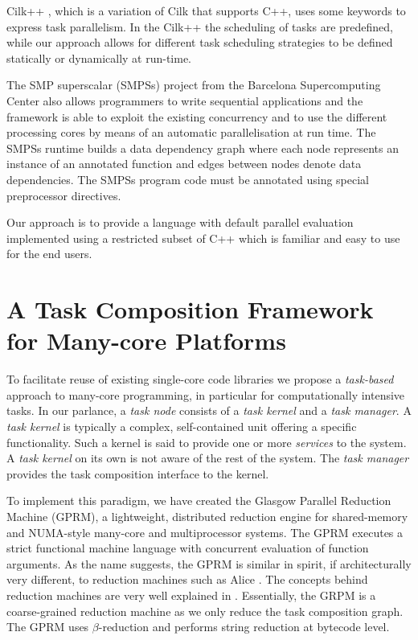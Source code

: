 \documentclass[copyright,creativecommons]{eptcs}
\begin{document}
Cilk++ \cite{leiserson2010cilk++}, which is a variation of Cilk that
supports C++, uses some keywords to express task parallelism. In the
Cilk++ the scheduling of tasks are predefined, while our approach
allows for different task scheduling strategies to be defined statically
or dynamically at run-time.

The SMP superscalar (SMPSs) project from the Barcelona Supercomputing
Center \cite{superscalar2008user,perez2008dependency} also allows
programmers to write sequential applications and the framework is
able to exploit the existing concurrency and to use the different
processing cores by means of an automatic parallelisation at run time.
The SMPSs runtime builds a data dependency graph where each node represents
an instance of an annotated function and edges between nodes denote
data dependencies. The SMPSs program code must be annotated using
special preprocessor directives. 

Our approach is to provide a language with default parallel evaluation
implemented using a restricted subset of C++ which is familiar and
easy to use for the end users. 


\section{A Task Composition Framework for Many-core Platforms}

To facilitate reuse of existing single-core code libraries we propose
a \emph{task-based} approach to many-core programming, in particular
for computationally intensive tasks. In our parlance, a \emph{task
node} consists of a \emph{task kernel} and a \emph{task manager}.
A \emph{task kernel} is typically a complex, self-contained unit offering
a specific functionality. Such a kernel is said to provide one or
more \emph{services} to the system. A \emph{task kernel} on its own
is not aware of the rest of the system. The \emph{task manager} provides
the task composition interface to the kernel. 

To implement this paradigm, we have created the Glasgow Parallel Reduction
Machine (GPRM), a lightweight, distributed reduction engine for shared-memory
and NUMA-style many-core and multiprocessor systems. The GPRM executes
a strict functional machine language with concurrent evaluation of
function arguments. As the name suggests, the GPRM is similar in spirit,
if architecturally very different, to reduction machines such as Alice
\cite{harrison1987parallel}. The concepts behind reduction machines
are very well explained in \cite{vree1989design}. Essentially, the
GRPM is a coarse-grained reduction machine as we only reduce the task
composition graph. The GPRM uses $\beta$-reduction and performs string
reduction at bytecode level.
\end{document}
